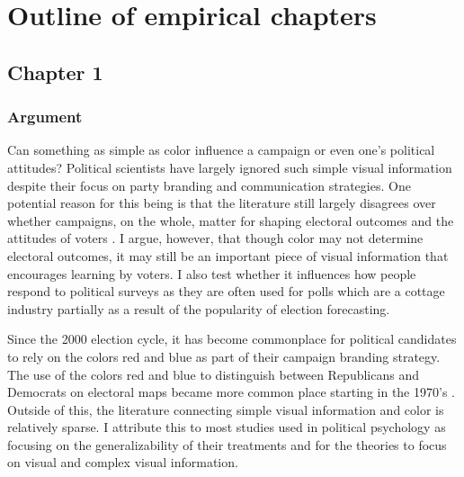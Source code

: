 \documentclass [12pt]{article}
\begin{document}
%
%
%
\section*{Outline of empirical chapters}
    \subsection*{Chapter 1}
        \subsubsection*{Argument}
Can something as simple as color influence a campaign or even one's political attitudes? Political scientists have largely ignored such simple visual information despite their focus on party branding and communication strategies. One potential reason for this being is that the literature still largely disagrees over whether campaigns, on the whole, matter for shaping electoral outcomes and the attitudes of voters \citep{broockman_kalla_2022_ajps}. I argue, however, that though color may not determine electoral outcomes, it may still be an important piece of visual information that encourages learning by voters. I also test whether it influences how people respond to political surveys as they are often used for polls which are a cottage industry partially as a result of the popularity of election forecasting.

Since the 2000 election cycle, it has become commonplace for political candidates to rely on the colors red and blue as part of their campaign branding strategy. The use of the colors red and blue to distinguish between Republicans and Democrats on electoral maps became more common place starting in the 1970's \citep{elving_2014_npr}. Outside of this, the literature connecting simple visual information and color is relatively sparse. I attribute this to most studies used in political psychology as focusing on the generalizability of their treatments and for the theories to focus on visual and complex visual information.
\end{document}
